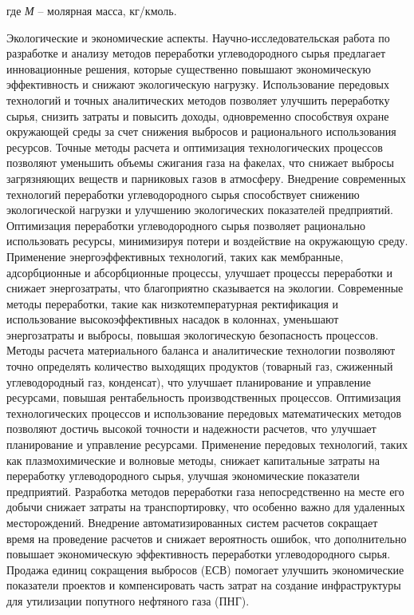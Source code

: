 где \emph{М} -- молярная масса, кг/кмоль.

Экологические и экономические аспекты. Научно-исследовательская работа
по разработке и анализу методов переработки углеводородного сырья
предлагает инновационные решения, которые существенно повышают
экономическую эффективность и снижают экологическую нагрузку.
Использование передовых технологий и точных аналитических методов
позволяет улучшить переработку сырья, снизить затраты и повысить доходы,
одновременно способствуя охране окружающей среды за счет снижения
выбросов и рационального использования ресурсов. Точные методы расчета и
оптимизация технологических процессов позволяют уменьшить объемы
сжигания газа на факелах, что снижает выбросы загрязняющих веществ и
парниковых газов в атмосферу. Внедрение современных технологий
переработки углеводородного сырья способствует снижению экологической
нагрузки и улучшению экологических показателей предприятий. Оптимизация
переработки углеводородного сырья позволяет рационально использовать
ресурсы, минимизируя потери и воздействие на окружающую среду.
Применение энергоэффективных технологий, таких как мембранные,
адсорбционные и абсорбционные процессы, улучшает процессы переработки и
снижает энергозатраты, что благоприятно сказывается на экологии.
Современные методы переработки, такие как низкотемпературная
ректификация и использование высокоэффективных насадок в колоннах,
уменьшают энергозатраты и выбросы, повышая экологическую безопасность
процессов. Методы расчета материального баланса и аналитические
технологии позволяют точно определять количество выходящих продуктов
(товарный газ, сжиженный углеводородный газ, конденсат), что улучшает
планирование и управление ресурсами, повышая рентабельность
производственных процессов. Оптимизация технологических процессов и
использование передовых математических методов позволяют достичь высокой
точности и надежности расчетов, что улучшает планирование и управление
ресурсами. Применение передовых технологий, таких как плазмохимические и
волновые методы, снижает капитальные затраты на переработку
углеводородного сырья, улучшая экономические показатели предприятий.
Разработка методов переработки газа непосредственно на месте его добычи
снижает затраты на транспортировку, что особенно важно для удаленных
месторождений. Внедрение автоматизированных систем расчетов сокращает
время на проведение расчетов и снижает вероятность ошибок, что
дополнительно повышает экономическую эффективность переработки
углеводородного сырья. Продажа единиц сокращения выбросов (ЕСВ) помогает
улучшить экономические показатели проектов и компенсировать часть затрат
на создание инфраструктуры для утилизации попутного нефтяного газа
(ПНГ).

